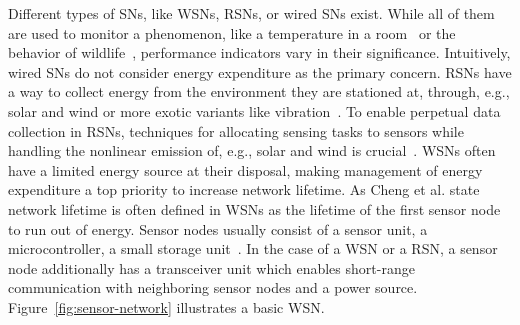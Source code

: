 Different types of \acp{SN}, like \acp{WSN}, \acp{RSN}, or wired \acp{SN}
exist. While all of them are used to monitor a phenomenon, like a temperature
in a room~\cite{labdata} or the behavior of
wildlife~\cite{bennett2011cranetracker}, performance indicators vary in their
significance. Intuitively, wired \acp{SN} do not consider energy expenditure as
the primary concern. \acp{RSN} have a way to collect energy from the
environment they are stationed at, through, e.g., solar and wind or more exotic
variants like vibration~\cite{perpetuum}. To enable perpetual data collection
in \acp{RSN}, techniques for allocating sensing tasks to sensors while handling
the nonlinear emission of, e.g., solar and wind is
crucial~\cite{liu2011perpetual}. \acp{WSN} often have a limited energy source
at their disposal, making management of energy expenditure a top priority to
increase network lifetime. As Cheng et al. state~\cite{cheng2013stcdg} network
lifetime is often defined in \acp{WSN} as the lifetime of the first sensor node
to run out of energy. Sensor nodes usually consist of a sensor unit, a
microcontroller, a small storage unit~\cite{akyildiz2002wireless}. In the case
of a \ac{WSN} or a \ac{RSN}, a sensor node additionally has a transceiver unit
which enables short-range communication with neighboring sensor nodes and a
power source. Figure~\ref{fig:sensor-network} illustrates a basic \ac{WSN}.

